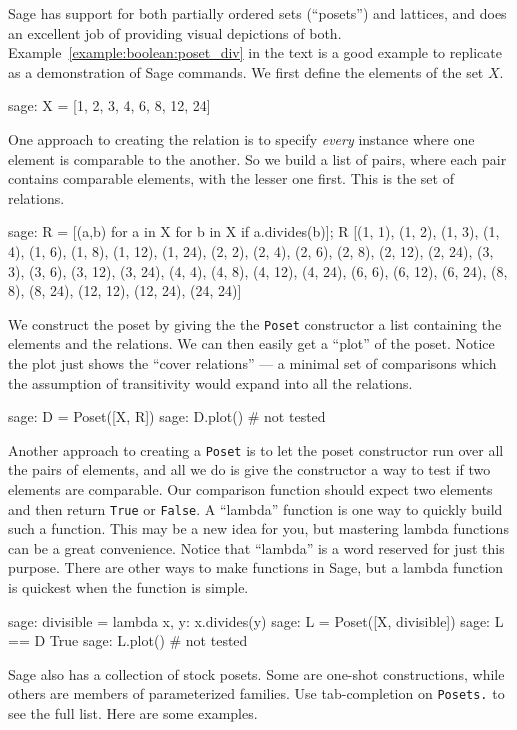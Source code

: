 Sage has support for both partially ordered sets (``posets'') and lattices, and does an excellent job of providing visual depictions of both.
%
%
Example~\ref{example:boolean:poset_div} in the text is a good example to replicate as a demonstration of Sage commands.  We first define the elements of the set $X$.
%
\begin{sageexample}
sage: X = [1, 2, 3, 4, 6, 8, 12, 24]
\end{sageexample}
%
One approach to creating the relation is to specify \emph{every} instance where one element is comparable to the another.  So we build a list of pairs, where each pair contains comparable elements, with the lesser one first.  This is the set of relations.
%
\begin{sageexample}
sage: R = [(a,b) for a in X for b in X if a.divides(b)]; R
[(1, 1), (1, 2), (1, 3), (1, 4), (1, 6), (1, 8), (1, 12), (1, 24),
 (2, 2), (2, 4), (2, 6), (2, 8), (2, 12), (2, 24), (3, 3), (3, 6),
 (3, 12), (3, 24), (4, 4), (4, 8), (4, 12), (4, 24), (6, 6),
 (6, 12), (6, 24), (8, 8), (8, 24), (12, 12), (12, 24), (24, 24)]
\end{sageexample}
%
We construct the poset by giving the the \verb?Poset? constructor a list containing the elements and the relations.  We can then easily get a ``plot'' of the poset.  Notice the plot just shows the ``cover relations'' --- a minimal set of comparisons which the assumption of transitivity would expand into all the relations.
%
\begin{sageexample}
sage: D = Poset([X, R])
sage: D.plot()    # not tested
\end{sageexample}
%
Another approach to creating a \verb?Poset? is to let the poset constructor run over all the pairs of elements, and all we do is give the constructor a way to test if two elements are comparable.  Our comparison function should expect two elements and then return \verb?True? or \verb?False?.  A ``lambda'' function is one way to quickly build such a function.  This may be a new idea for you, but mastering lambda functions can be a great convenience.  Notice that ``lambda'' is a word reserved for just this purpose.  There are other ways to make functions in Sage, but a lambda function is quickest when the function is simple.
%
\begin{sageexample}
sage: divisible = lambda x, y: x.divides(y)
sage: L = Poset([X, divisible])
sage: L == D
True
sage: L.plot()    # not tested
\end{sageexample}
%
Sage also has a collection of stock posets.  Some are one-shot constructions, while others are members of parameterized families.  Use tab-completion on \verb?Posets.? to see the full list.  Here are some examples.

